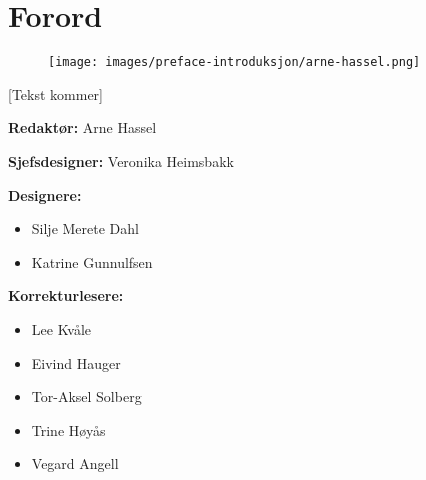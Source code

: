 \chapter*{Forord}

\begin{figure}
	\texttt{[image: images/preface-introduksjon/arne-hassel.png]}
	\label{fig:arne-hassel}
\end{figure}

[Tekst kommer]

\textbf{Redaktør:} Arne Hassel

\textbf{Sjefsdesigner:} Veronika Heimsbakk

\textbf{Designere:}

\begin{itemize}
	\item Silje Merete Dahl
	\item Katrine Gunnulfsen
\end{itemize}

\textbf{Korrekturlesere:}

\begin{itemize}
	\item Lee Kvåle
	\item Eivind Hauger
	\item Tor-Aksel Solberg
	\item Trine Høyås
	\item Vegard Angell
\end{itemize}

